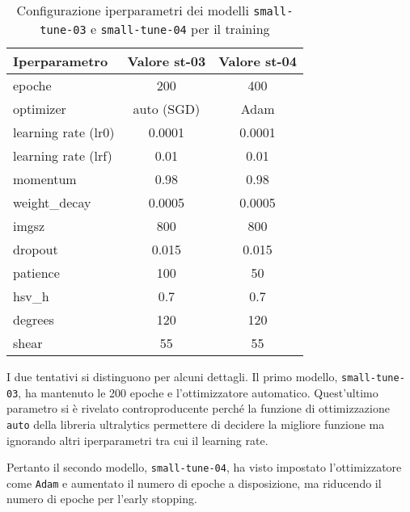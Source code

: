 \begin{table}[!htb]
    \centering
    \begin{tabular}{lcc}
        \hline
        \textbf{Iperparametro} & \textbf{Valore st-03} & \textbf{Valore st-04}\\
        \hline
        epoche & 200 & 400 \\
        optimizer & auto (SGD) & Adam \\
        learning rate (lr0) & 0.0001 & 0.0001\\
        learning rate (lrf) & 0.01 & 0.01 \\
        momentum & 0.98 & 0.98\\
        weight\_decay & 0.0005 & 0.0005\\
        imgsz & 800 & 800 \\
        dropout & 0.015 & 0.015 \\
        patience & 100 & 50\\
        \midrule
        hsv\_h & 0.7 & 0.7 \\
        degrees & 120 & 120 \\
        shear & 55 & 55 \\
        \hline
    \end{tabular}
    \caption{Configurazione iperparametri dei modelli \texttt{small-tune-03} e \texttt{small-tune-04} per il training}
    \label{tab:v4-model-configs}
    \end{table}

I due tentativi si distinguono per alcuni dettagli. Il primo modello, \texttt{small-tune-03},
ha mantenuto le 200 epoche e l'ottimizzatore automatico. Quest'ultimo parametro si è rivelato
 controproducente perché la funzione di ottimizzazione \texttt{auto} della libreria ultralytics
permettere di decidere la migliore funzione ma ignorando altri iperparametri tra cui il learning rate.

Pertanto il secondo modello, \texttt{small-tune-04}, ha visto impostato l'ottimizzatore come \texttt{Adam} 
e aumentato il numero di epoche a disposizione, ma riducendo il numero di epoche per l'early stopping.


